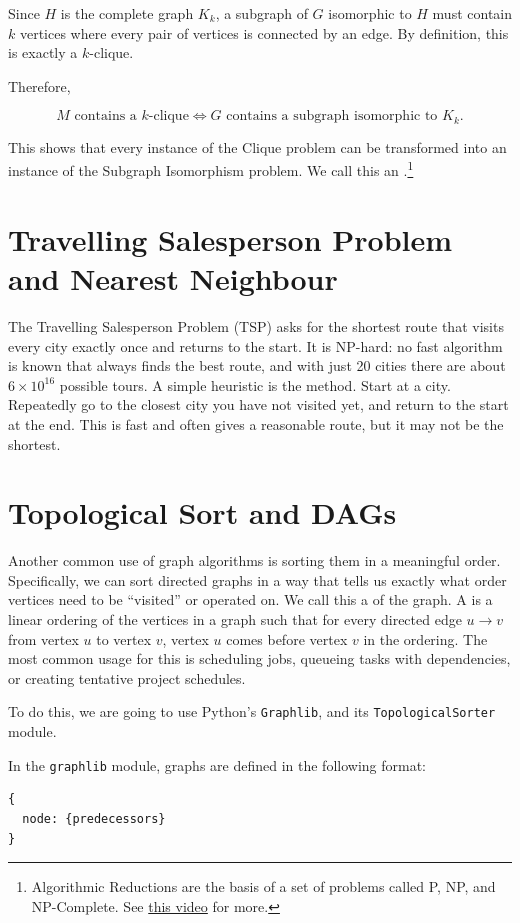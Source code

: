 Since $H$ is the complete graph $K_k$, a subgraph of $G$ isomorphic to $H$ must contain $k$ vertices where every pair of vertices is connected by an edge. By definition, this is exactly a $k$-clique.

Therefore,

\[
	M \text{ contains a } k\text{-clique}\iff G \text{ contains a subgraph isomorphic to } K_k.
\]

This shows that every instance of the Clique problem can be transformed into an instance of the Subgraph Isomorphism problem. We call this an .\footnote{Algorithmic Reductions are the basis of a set of problems called P, NP, and NP-Complete. See \href{https://youtu.be/eHZifpgyH_4}{this video} for more.} 

\section{Travelling Salesperson Problem and Nearest Neighbour}
The Travelling Salesperson Problem (TSP) asks for the shortest route that visits every city exactly once and returns to the start. It is NP-hard: no fast algorithm is known that always finds the best route, and with just 20 cities there are about $6 \times 10^{16}$ possible tours. A simple heuristic is the  method. Start at a city. Repeatedly go to the closest city you have not visited yet, and return to the start at the end. This is fast and often gives a reasonable route, but it may not be the shortest.
\section{Topological Sort and DAGs}
Another common use of graph algorithms is sorting them in a meaningful order. Specifically, we can sort directed graphs in a way that tells us exactly what order vertices need to be ``visited'' or operated on. We call this a  of the graph. A  is a linear ordering of the vertices in a graph such that for every directed edge $u \rightarrow v$ from vertex $u$ to vertex $v$, vertex $u$ comes before vertex $v$ in the ordering. The most common usage for this is scheduling jobs, queueing tasks with dependencies, or creating tentative project schedules.

To do this, we are going to use Python's \texttt{Graphlib}, and its \texttt{TopologicalSorter} module.

In the \texttt{graphlib} module, graphs are defined in the following format:
\begin{verbatim}
{
  node: {predecessors}
}
\end{verbatim}

